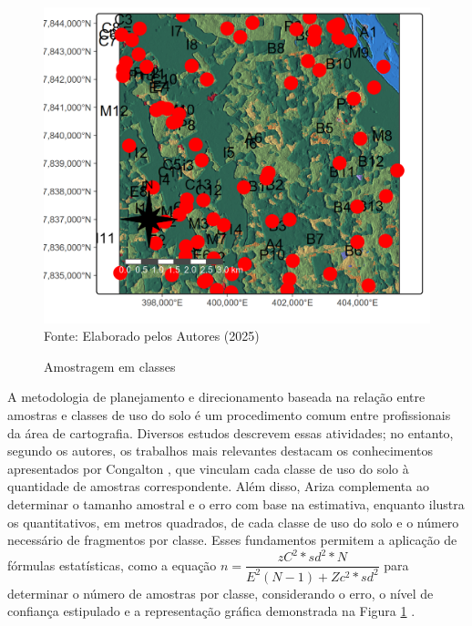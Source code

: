                 \begin{figure}
  	\begin{center}
  		\centering  \small \caption{Amostragem em classes}
  		\includegraphics[width=0.97\linewidth]{FIGURAS/usoSOLOamostras}
  		\label{fig:usoSOLOamostras}\\{ Fonte:   Elaborado pelos Autores (2025)}
  	\end{center}
  \end{figure} 
 \hspace*{1.25 cm} A metodologia de planejamento e direcionamento baseada na relação entre amostras e classes de uso do solo é um procedimento comum entre profissionais da área de cartografia. Diversos estudos descrevem essas atividades; no entanto, segundo os autores, os trabalhos mais relevantes destacam os conhecimentos apresentados por Congalton \cite[p.79]{Congalton}, que vinculam cada classe de uso do solo à quantidade de amostras correspondente. Além disso, Ariza \cite[p.135]{Ariza} complementa ao determinar o tamanho amostral e o erro com base na estimativa, enquanto \cite[p.192-196]{Ariza} ilustra os quantitativos, em metros quadrados, de cada classe de uso do solo e o número necessário de fragmentos por classe. Esses fundamentos permitem a aplicação de fórmulas estatísticas, como a equação \( n= \dfrac{zC ^{2} * sd^{2}* N}{ E^{2}(N-1) + Zc^{2}*sd^{2}} \) para determinar o número de amostras por classe, considerando o erro, o nível de confiança estipulado e a representação gráfica demonstrada na Figura \ref{fig:usoSOLOamostras}  .\\
    

